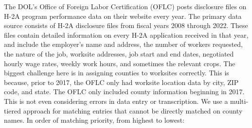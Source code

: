 \documentclass[14pt]{article}
\begin{document}
The DOL's Office of Foreign Labor Certification (OFLC) posts disclosure files on H-2A program performance data on their website every year.
The primary data source consists of H-2A disclosure files from fiscal years 2008 through 2022.
These files contain detailed information on every H-2A application received in that year, and include the employer's name and address, the number of workers requested, the nature of the job, worksite addresses, job start and end dates, negotiated hourly wage rates, weekly work hours, and sometimes the relevant crops.
The biggest challenge here is in assigning counties to worksites correctly.
This is because, prior to 2017, the OFLC only had worksite location data by city, ZIP code, and state.
The OFLC only included county information beginning in 2017.
This is not even considering errors in data entry or transcription.
We use a multi-tiered approach for matching entries that cannot be directly matched on county names.
In order of matching priority, from highest to lowest:
\end{document}
